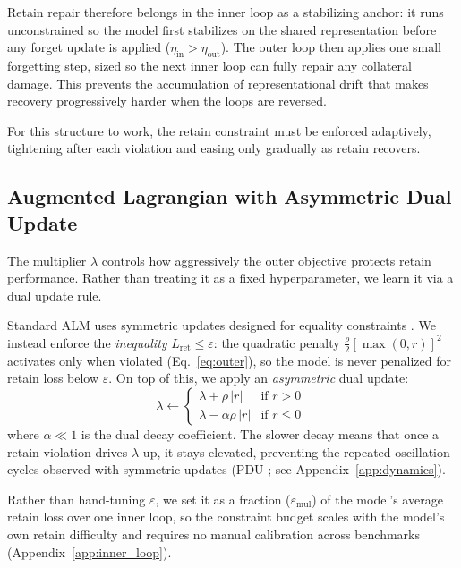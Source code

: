 Retain repair therefore belongs in the inner loop as a stabilizing anchor: it runs unconstrained so the model first stabilizes on the shared representation before any forget update is applied ($\eta_{\text{in}} > \eta_{\text{out}}$). The outer loop then applies one small forgetting step, sized so the next inner loop can fully repair any collateral damage. This prevents the accumulation of representational drift that makes recovery progressively harder when the loops are reversed.

For this structure to work, the retain constraint must be enforced adaptively, tightening after each violation and easing only gradually as retain recovers.

\subsection{Augmented Lagrangian with Asymmetric Dual Update}
\label{sec:alm}

The multiplier $\lambda$ controls how aggressively the outer objective protects retain performance.
Rather than treating it as a fixed hyperparameter, we learn it via a dual update rule.

Standard ALM uses symmetric updates designed for equality constraints \citep{bertsekas1999nonlinear, nocedal2006numerical}.
We instead enforce the \emph{inequality} $L_{\text{ret}} \leq \varepsilon$: the quadratic penalty $\frac{\rho}{2}[\max(0, r)]^2$ activates only when violated (Eq.~\ref{eq:outer}), so the model is never penalized for retain loss below $\varepsilon$.
On top of this, we apply an \emph{asymmetric} dual update:
\begin{equation}
    \lambda \leftarrow \begin{cases}
        \lambda + \rho \,|r| & \text{if } r > 0 \;\\
        \lambda - \alpha\rho \,|r| & \text{if } r \leq 0 \;
    \end{cases}
    \label{eq:dual_update}
\end{equation}
where $\alpha \ll 1$ is the dual decay coefficient. The slower decay means that once a retain violation drives $\lambda$ up, it stays elevated, preventing the repeated oscillation cycles observed with symmetric updates (PDU \citep{entesari2026constrained}; see Appendix~\ref{app:dynamics}).

Rather than hand-tuning $\varepsilon$, we set it as a fraction ($\varepsilon_{\text{mul}}$) of the model's average retain loss over one inner loop, so the constraint budget scales with the model's own retain difficulty and requires no manual calibration across benchmarks (Appendix~\ref{app:inner_loop}).

